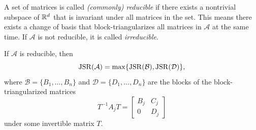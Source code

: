 \begin{definition}\citep{Jungers2009JointSpectralRadius}
    \label{def:matrixSetReducibility}
    A set of matrices is called \emph{(commonly) reducible} if there exists a nontrivial subspace of $\mathbb{R}^d$ that is invariant under all matrices in the set.
    This means there exists a change of basis that block-triangularizes all matrices in $\mathcal{A}$ at the same time.
    If $\mathcal{A}$ is not reducible, it is called \emph{irreducible}.
\end{definition}

\begin{proposition}\citep{Protasov1997GeneralizedSpectralRadiusGeometric}
    \label{prop:reducibleBlockDecomposition}
    If $\mathcal{A}$ is reducible, then
    \begin{equation}
        \operatorname{JSR}(\mathcal{A}) = \max \{ \operatorname{JSR}(\mathcal{B}), \operatorname{JSR}(\mathcal{D}) \},
    \end{equation}
    where $\mathcal{B} = \{B_1,\dots, B_n\}$ and $\mathcal{D} = \{D_1,\dots, D_n\}$ are the blocks of the block-triangularized matrices
    \[
        T^{-1}A_jT =
        \begin{bmatrix}
            B_j & C_j \\
            0   & D_j
        \end{bmatrix}
    \]
    under some invertible matrix $T$.
\end{proposition}
